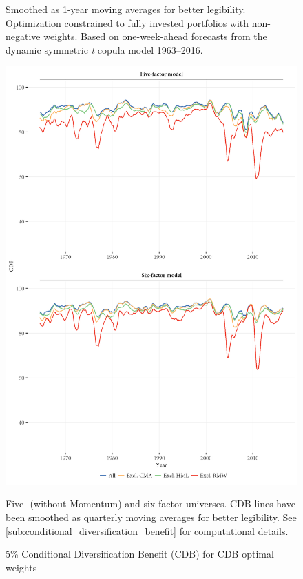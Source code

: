\begin{figure}[htbp]
  \begin{longcaption}
    Smoothed as 1-year moving averages for better legibility. Optimization constrained to fully invested portfolios with non-negative weights. Based on one-week-ahead forecasts from the dynamic symmetric \emph{t} copula model 1963--2016.
  \end{longcaption}
\end{figure}

\begin{figure}[htbp]
  \centering
  \footnotesize
  \includegraphics[width = \textwidth]{graphics/cdb/CDB.png}
  \caption{5\% Conditional Diversification Benefit (CDB) for CDB optimal weights}

  \begin{longcaption}
    Five- (without Momentum) and six-factor universes. CDB lines have been smoothed as quarterly moving averages for better legibility. See \autoref{sub:conditional_diversification_benefit} for computational details.
  \end{longcaption}
  \label{fig:cdb_cdb}
\end{figure}

